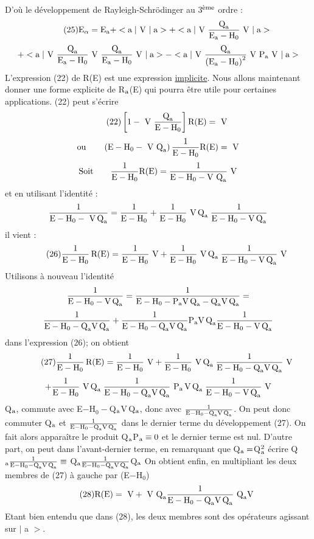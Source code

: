 D'où le développement de Rayleigh-Schrödinger au 3$^{\text{ème}}$ ordre :
\[
\tag{25}\text{E}_\alpha=\text{E}_{\text{a}}+<\text{a}\;|\text{ V }|\;\text{a}>+<\text{a}\;|\text{ V }
\frac{\text{Q}_{\text{a}}}{\text{E}_{\text{a}}-\text{H}_0}\text{ V }|\;\text{a}>
\]
\[
+<\text{a}\;|\text{ V }\frac{\text{Q}_{\text{a}}}{\text{E}_{\text{a}}-\text{H}_0}\text{ V }
\frac{\text{Q}_{\text{a}}}{\text{E}_{\text{a}}-\text{H}_0}\text{ V }|\;\text{a}>-<\text{a}\;|\text{ V }
\frac{\text{Q}_{\text{a}}}{\left(\text{E}_{\text{a}}-\text{H}_0\right)^2}\text{ V P}_{\text{a}}\text{ V }|\;\text{a}>
\]
L'expression (22) de R(E) est une expression \ul{implicite}. Nous allons maintenant
donner une forme explicite de R$_{\text{a}}$(E) qui pourra être utile pour certaines applications. (22) peut s'écrire
\[
\tag{22}\left[1-\text{ V }\frac{\text{Q}_{\text{a}}}{\text{E}-\text{H}_0}\right]\text{R(E)}=\text{ V}
\]
\[
\text{ou}\qquad\left(\text{E}-\text{H}_0-\text{ V Q}_{\text{a}}\right)\frac{1}{\text{E}-\text{H}_0}\text{R(E)}=\text{ V}
\]
\[
\text{Soit}\qquad\frac{1}{\text{E}-\text{H}_0}\text{R(E)}=\frac{1}{\text{E}-\text{H}_0-\text{V Q}_{\text{a}}}\text{ V}
\]
et en utilisant l'identité :
\[
\frac{1}{\text{E}-\text{H}_0-\text{ V\,Q}_{\text{a}}}=\frac{1}{\text{E}-\text{H}_0}+
\frac{1}{\text{E}-\text{H}_0}\text{ V\,Q}_{\text{a }}\frac{1}{\text{E}-\text{H}_0-\text{V\,Q}_{\text{a}}}
\]
il vient :
\[
\tag{26}\frac{1}{\text{E}-\text{H}_0}\,\text{R(E)}=\frac{1}{\text{E}-\text{H}_0}\text{ V}+
\frac{1}{\text{E}-\text{H}_0}\text{ V\,Q}_{\text{a }}\frac{1}{\text{E}-\text{H}_0-\text{V\,Q}_{\text{a}}}\text{ V}
\]
Utilisons à nouveau l'identité
\[
\frac{1}{\text{E}-\text{H}_0-\text{V\,Q}_{\text{a}}}
=\frac{1}{\text{E}-\text{H}_0-\text{P}_{\text{a}}\text{V\,Q}_{\text{a}}-\text{Q}_{\text{a}}\text{V\,Q}_{\text{a}}}=
\]
\[
\frac{1}{\text{E}-\text{H}_0-\text{Q}_{\text{a}}\text{V\,Q}_{\text{a}}}
+\frac{1}{\text{E}-\text{H}_0-\text{Q}_{\text{a}}\text{V\,Q}_{\text{a}}}\text{P}_{\text{a}}\text{V\,Q}_{\text{a}}
\frac{1}{\text{E}-\text{H}_0-\text{V\,Q}_{\text{a}}}
\]
dans l'expression (26); on obtient
\[
\tag{27}\frac{1}{\text{E}-\text{H}_0}\,\text{R(E)}=\frac{1}{\text{E}-\text{H}_0}\text{ V}+
\frac{1}{\text{E}-\text{H}_0}\text{ V\,Q}_{\text{a }}\frac{1}{\text{E}-\text{H}_0-\text{Q}_{\text{a}}\text{V\,Q}_{\text{a}}}\text{ V}
\]
\[
+\frac{1}{\text{E}-\text{H}_0}\text{ V\,Q}_{\text{a }}
\frac{1}{\text{E}-\text{H}_0-\text{Q}_{\text{a}}\text{V\,Q}_{\text{a}}}\text{ P}_{\text{a}}\text{\,V\,Q}_{\text{a }}
\frac{1}{\text{E}-\text{H}_0-\text{V\,Q}_{\text{a}}}\text{ V}
\]
Q$_{\text{a}}$, commute avec E$-$H$_0-$Q$_{\text{a}}$V\,Q$_{\text{a}}$, 
donc avec $\frac{1}{\text{E}-\text{H}_0-\text{Q}_{\text{a}}\text{V\,Q}_{\text{a}}}$.
On peut donc commuter Q$_{\text{a}}$ et $\frac{1}{\text{E}-\text{H}_0-\text{Q}_{\text{a}}\text{V\,Q}_{\text{a}}}$ dans le dernier terme du
développement (27). On fait alors apparaître le produit Q$_{\text{a}}$P$_{\text{a}}\equiv0$ et le dernier terme est nul.
D'autre part, on peut dans l'avant-dernier terme, en remarquant que Q$_{\text{a}}=$Q$_{\text{a}}^2$ écrire
Q$_{\text{a}}\frac{1}{\text{E}-\text{H}_0-\text{Q}_{\text{a}}\text{V\,Q}_{\text{a}}}\equiv$ Q$_{\text{a}}
\frac{1}{\text{E}-\text{H}_0-\text{Q}_{\text{a}}\text{V\,Q}_{\text{a}}}$Q$_{\text{a}}$
On obtient enfin, en multipliant les deux membres de (27) à gauche par (E$-$H$_0$)
\[
\tag{28}\text{R(E)}=\text{ V}+\text{ V Q}_{\text{a}}\frac{1}{\text{E}-\text{H}_0-\text{Q}_{\text{a}}\text{V\,Q}_{\text{a}}}\text{ Q}_{\text{a}}\text{V}
\]
Etant bien entendu que dans (28), les deux membres sont des opérateurs agissant sur $|$ a $>$.

